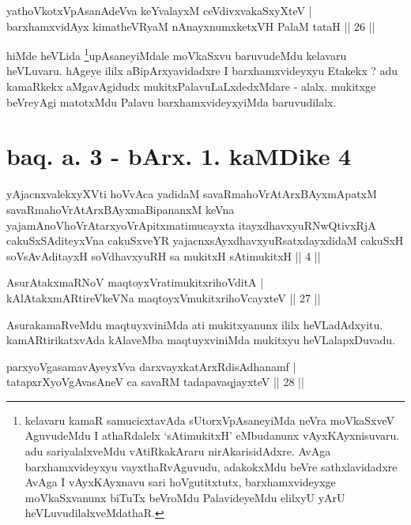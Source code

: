 \begin{shl}
yathoVkotxVpAsanAdeVva keYvalayxM ceVdivxvakaSxyXteV |\\
barxhamxvidAyx kimatheVRyaM nAnayxnumxketxVH PalaM tataH \hfill || 26 ||
\end{shl}

\begin{artha}
hiMde heVLida \footnote[2]{kelavaru kamaR samucicxtavAda sUtorxVpAsaneyiMda neVra moVkaSxveV AguvudeMdu I athaRdalelx `sAtimukitxH' eMbudanunx vAyxKAyxnisuvaru. adu sariyalalxveMdu vAtiRkakAraru nirAkarisidAdxre. AvAga barxhamxvideyxyu vayxthaRvAguvudu, adakokxMdu beVre sathxlavidadxre AvAga I vAyxKAyxnavu sari hoVgutitxtutx, barxhamxvideyxge moVkaSxvanunx biTuTx beVroMdu PalavideyeMdu elilxyU yArU heVLuvudilalxveMdathaR.}upAsaneyiMdale moVkaSxvu baruvudeMdu kelavaru heVLuvaru. hAgeye ililx aBipArxyavidadxre I barxhamxvideyxyu Etakekx ? adu kamaRkekx aMgavAgidudx mukitxPalavuLaLxdedxMdare - alalx. mukitxge beVreyAgi matotxMdu Palavu barxhamxvideyxyiMda baruvudilalx.
\end{artha}

\section*{baq. a. 3 - bArx. 1. kaMDike 4}

\begin{shl}
yAjacnxvalekxyXVti hoVvAca yadidaM savaRmahoVrAtArxBAyxmApatxM savaRmahoVrAtArxBAyxmaBipananxM keVna yajamAnoV\s hoVrAtarxyoVrApitxmatimucayxta itayxdhavxyuRNwQtivxRjA cakuSxSAditeyxVna cakuSxveYR yajacnxsAyxdhavxyuRsatxdayxdidaM cakuSxH soV\s sAvAditayxH soV\s dhavxyuRH sa mukitxH sAtimukitxH || 4 ||
\end{shl}

\begin{shl}
AsurAtakxmaRNoV maqtoyxVratimukitxrihoVditA |\\
kAlAtakxmARtireVkeVNa maqtoyxVmukitxrihoVcayxteV \hfill || 27 ||
\end{shl}

\begin{artha}
AsurakamaRveMdu maqtuyxviniMda ati mukitxyanunx ililx heVLadAdxyitu. kamARtirikatxvAda kAlaveMba maqtuyxviniMda mukitxyu heVLalapxDuvadu.
\end{artha}


\begin{shl}
parxyoVgasamavAyeyxVva darxvayxkatArxRdisAdhanamf |\\
tatapxrXyoVgAvasAneV ca savaRM tadapavaqjayxteV \hfill || 28 ||
\end{shl}

